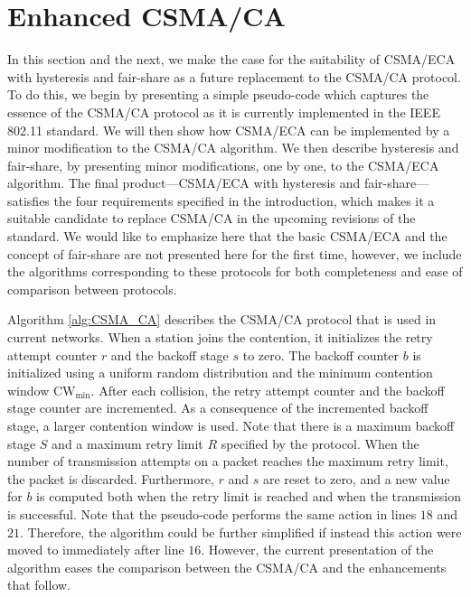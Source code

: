 \documentclass[conference]{IEEEtran}
\begin{document}
\section{Enhanced CSMA/CA}

In this section and the next, we make the case for the suitability of CSMA/ECA with hysteresis and fair-share as a future replacement to the CSMA/CA protocol. To do this, we begin by presenting a simple pseudo-code which captures the essence of the CSMA/CA protocol as it is currently implemented in the IEEE 802.11 standard. We will then show how CSMA/ECA can be implemented by a minor modification to the CSMA/CA algorithm. We then describe hysteresis and fair-share, by presenting minor modifications, one by one, to the CSMA/ECA algorithm. The final product---CSMA/ECA with hysteresis and fair-share---satisfies the four requirements specified in the introduction, which makes it a suitable candidate to replace CSMA/CA in the upcoming revisions of the standard. We would like to emphasize here that the basic CSMA/ECA and the concept of fair-share are not presented here for the first time, however, we include the algorithms corresponding to these protocols for both completeness and ease of comparison between protocols.

Algorithm \ref{alg:CSMA_CA} describes the CSMA/CA protocol that is used in current networks.
When a station joins the contention, it initializes the retry attempt counter $r$ and the backoff stage $s$ to zero. The backoff counter $b$ is initialized using a uniform random distribution and the minimum contention window $\text{CW}_{\min}$. After each collision, the retry attempt counter and the backoff stage counter are incremented. As a consequence of the incremented backoff stage, a larger contention window is used. Note that there is a maximum backoff stage $S$ and a maximum retry limit $R$ specified by the protocol. When the number of transmission attempts on a packet reaches the maximum retry limit, the packet is discarded. Furthermore, $r$ and $s$ are reset to zero, and a new value for $b$ is computed both when the retry limit is reached and when the transmission is successful. Note that the pseudo-code performs the same action in lines $18$ and $21$. Therefore, the algorithm could be further simplified if instead this action were moved to immediately after line $16$. However, the current presentation of the algorithm eases the comparison between the CSMA/CA and the enhancements that follow.

%
%
\end{document}
